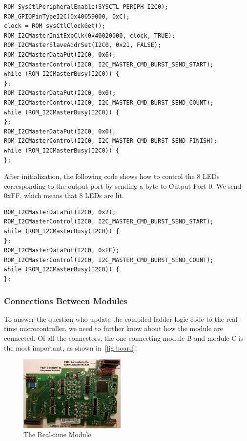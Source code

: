 \begin{lstlisting}[style=code, caption={Pseud Code for Initializing the I2C Slave Device for the Ouput Port LED Lights}, captionpos=b]
ROM_SysCtlPeripheralEnable(SYSCTL_PERIPH_I2C0);
ROM_GPIOPinTypeI2C(0x40059000, 0xC);
clock = ROM_sysCtlClockGet();
ROM_I2CMasterInitExpClk(0x40020000, clock, TRUE);
ROM_I2CMasterSlaveAddrSet(I2C0, 0x21, FALSE);
ROM_I2CMasterDataPut(I2C0, 0x6);
ROM_I2CMasterControl(I2C0, I2C_MASTER_CMD_BURST_SEND_START);
while (ROM_I2CMasterBusy(I2C0)) {
};
ROM_I2CMasterDataPut(I2C0, 0x0);
ROM_I2CMasterControl(I2C0, I2C_MASTER_CMD_BURST_SEND_COUNT);
while (ROM_I2CMasterBusy(I2C0)) {
};
ROM_I2CMasterDataPut(I2C0, 0x0);
ROM_I2CMasterControl(I2C0, I2C_MASTER_CMD_BURST_SEND_FINISH);
while (ROM_I2CMasterBusy(I2C0)) {
};
\end{lstlisting}

After initialization, the following code shows how to control the 8 LEDs corresponding to the output port by sending a byte to Output Port 0. We send 0xFF, which means that 8 LEDs are lit.
\begin{lstlisting}[style=code, caption={Pseud Code for Controlling LED Lights}, captionpos=b]
ROM_I2CMasterDataPut(I2C0, 0x2);
ROM_I2CMasterControl(I2C0, I2C_MASTER_CMD_BURST_SEND_START);
while (ROM_I2CMasterBusy(I2C0)) {
};
ROM_I2CMasterDataPut(I2C0, 0xFF);
ROM_I2CMasterControl(I2C0, I2C_MASTER_CMD_BURST_SEND_COUNT);
while (ROM_I2CMasterBusy(I2C0)) {
};
\end{lstlisting}


\subsubsection{Connections Between Modules}

To answer the question who update the compiled ladder logic code to the real-time microcontroller, we need to further know about how the module are connected. Of all the connectors, the one connecting module B and module C is the most important, as shown in~\autoref{fig:board}. 

\begin{figure}[th]
	\includegraphics[width=0.47\textwidth]{figures/board}
	\centering
	\caption{The Real-time Module}
	\label{fig:board}
\end{figure}

